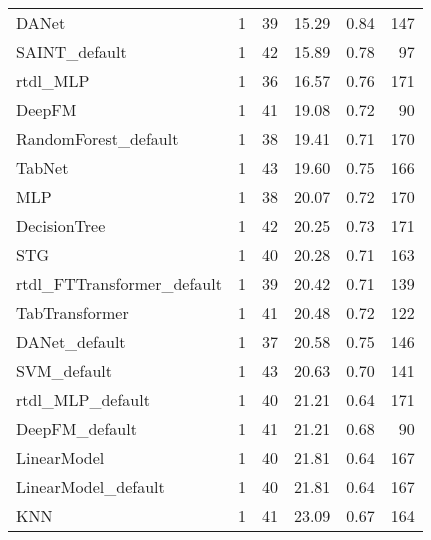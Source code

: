 \begin{tabular}{lrrrrr}
DANet                      &                  1 &  39 &  15.29 &                           0.84 &   147 \\
SAINT_default              &                  1 &  42 &  15.89 &                           0.78 &    97 \\
rtdl_MLP                   &                  1 &  36 &  16.57 &                           0.76 &   171 \\
DeepFM                     &                  1 &  41 &  19.08 &                           0.72 &    90 \\
RandomForest_default       &                  1 &  38 &  19.41 &                           0.71 &   170 \\
TabNet                     &                  1 &  43 &  19.60 &                           0.75 &   166 \\
MLP                        &                  1 &  38 &  20.07 &                           0.72 &   170 \\
DecisionTree               &                  1 &  42 &  20.25 &                           0.73 &   171 \\
STG                        &                  1 &  40 &  20.28 &                           0.71 &   163 \\
rtdl_FTTransformer_default &                  1 &  39 &  20.42 &                           0.71 &   139 \\
TabTransformer             &                  1 &  41 &  20.48 &                           0.72 &   122 \\
DANet_default              &                  1 &  37 &  20.58 &                           0.75 &   146 \\
SVM_default                &                  1 &  43 &  20.63 &                           0.70 &   141 \\
rtdl_MLP_default           &                  1 &  40 &  21.21 &                           0.64 &   171 \\
DeepFM_default             &                  1 &  41 &  21.21 &                           0.68 &    90 \\
LinearModel                &                  1 &  40 &  21.81 &                           0.64 &   167 \\
LinearModel_default        &                  1 &  40 &  21.81 &                           0.64 &   167 \\
KNN                        &                  1 &  41 &  23.09 &                           0.67 &   164 \\

\end{tabular}
